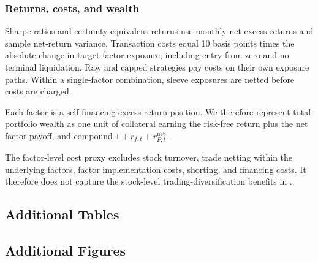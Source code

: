 \documentclass[preprint,12pt,authoryear]{elsarticle}
\begin{document}
\begin{appendices}
\subsubsection{Returns, costs, and wealth}

 Sharpe ratios and certainty-equivalent returns use monthly net excess returns and sample net-return variance. Transaction costs equal 10 basis points times the absolute change in target factor exposure, including entry from zero and no terminal liquidation. Raw and capped strategies pay costs on their own exposure paths. Within a single-factor combination, sleeve exposures are netted before costs are charged.

Each factor is a self-financing excess-return position. We therefore represent total portfolio wealth as one unit of collateral earning the risk-free return plus the net factor payoff, and compound $1+r_{f,t}+r^{\mathrm{net}}_{P,t}$.

The factor-level cost proxy excludes stock turnover, trade netting within the underlying factors, factor implementation costs, shorting, and financing costs. It therefore does not capture the stock-level trading-diversification benefits in \citet{demiguelmartinutrerauppal2024}.

\subsection{Additional Tables}







\subsection{Additional Figures}















\end{appendices}
\end{document}
